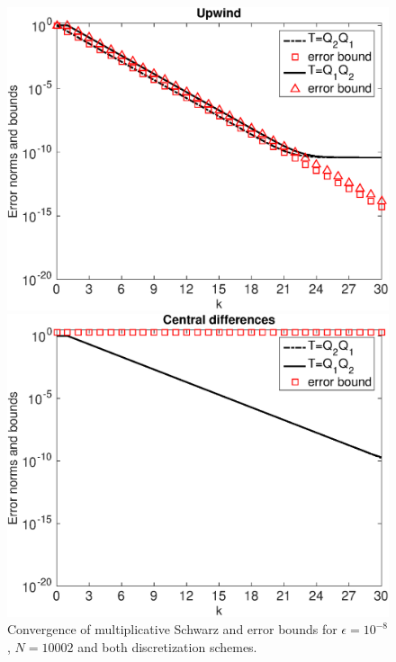 \begin{figure}[tbhp]
\begin{minipage}[t]{0.49\linewidth}
\includegraphics[width=0.95\linewidth]{figures/mSm_upwind_eps_1e-04_N_10002}
\end{minipage}
%
\begin{minipage}[t]{0.49\linewidth}
\includegraphics[width=0.95\linewidth]{figures/mSm_central_eps_1e-08_N_10002}
\end{minipage}
\caption{Convergence of multiplicative Schwarz and error bounds for
$\epsilon=10^{-8}$, $N=10002$ and both discretization schemes.}
\label{fig:1D:MSM.N10002.eps8}
\end{figure}

